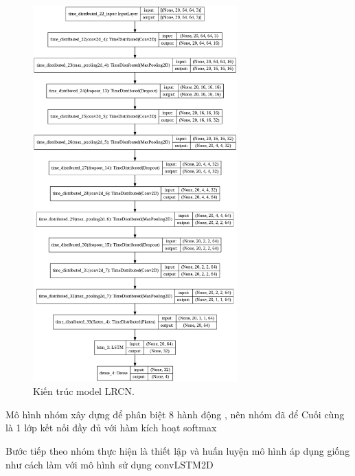 \newpage
\begin{figure}[h!]
	\centering
	\includegraphics[width=0.7\textwidth]{Figures/model_lrcn.png}
	\caption[Kiến trúc model LRCN.]{Kiến trúc model LRCN.}
	\label{model_lrcn.png} 
    \end{figure}
\newpage
Mô hình nhóm xây dựng để phân biệt 8 hành động , nên nhóm đã để Cuối cùng là 1 lớp kết nối đầy đủ với hàm kích hoạt softmax 

Bước tiếp theo nhóm thực hiện là thiết lập và huấn luyện mô hình  áp dụng giống như cách làm với mô hình sử dụng convLSTM2D

